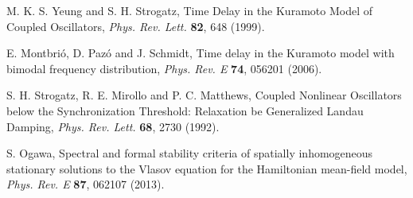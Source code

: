 \begin{thebibliography}{99}
  M. K. S. Yeung and S. H. Strogatz,
  Time Delay in the Kuramoto Model of Coupled Oscillators,
  \textit{Phys. Rev. Lett.} {\bf 82}, 648 (1999).

  E. Montbri{\'o}, D. Paz{\'o} and J. Schmidt,
  Time delay in the Kuramoto model with bimodal frequency distribution,
  \textit{Phys. Rev. E} {\bf 74}, 056201 (2006).

  S. H. Strogatz, R. E. Mirollo and P. C. Matthews,
  Coupled Nonlinear Oscillators below the Synchronization Threshold: Relaxation be Generalized Landau Damping,
  \textit{Phys. Rev. Lett.} {\bf 68}, 2730 (1992).

  S. Ogawa,
  Spectral and formal stability criteria of spatially inhomogeneous stationary solutions to the Vlasov equation for the Hamiltonian mean-field model,
  \textit{Phys. Rev. E} {\bf 87}, 062107 (2013). 

\end{thebibliography}